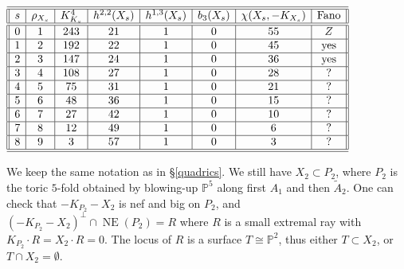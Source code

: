 \documentclass[a4paper,12pt]{amsart}
\theoremstyle{definition}
\numberwithin{figure}{section}
\numberwithin{table}{section}
\newcommand{\w}{\widetilde}
\newcommand{\pr}{\mathbb{P}}
\newcommand{\NE}{\operatorname{NE}}
\begin{document}
{\small\begin{table}[h]
 $\begin{array}{||c|c|c|c|c|c|c|c||}
   \hline\hline
   
s   & \rho_{X_s} & K_{K_s}^4 & h^{2,2}(X_s) & h^{1,3}(X_s) &b_3(X_s)& \chi(X_s,-K_{X_s}) & \text{Fano}\\
      \hline\hline

         0 & 1 & 243 & 21 & 1 & 0 & 55 & Z \\

        \hline

       1 & 2 & 192 & 22  & 1 & 0 & 45 & \text{yes}\\

       \hline

     2 & 3 & 147 & 24 & 1 & 0 & 36  & \text{yes}\\

       
  \hline

      3 & 4 & 108 &27 &  1  & 0 & 28 & ?\\

        \hline

    4  & 5 & 75 & 31 &  1 & 0 & 21 & ?\\

     \hline

       5 & 6 & 48 & 36 & 1  & 0 & 15 & ?\\

       \hline

     6 & 7 & 27 & 42 & 1  & 0 & 10  & ?\\

       
  \hline

      7 & 8 & 12 & 49 & 1  & 0 & 6 & ?\\

        \hline

      8  & 9 & 3 & 57 & 1  & 0 & 3 & ?\\
      
\hline\hline
  \end{array}$

\bigskip
  
  \caption{Invariants of the blow-ups of a cubic $4$-fold along $s$ planes}\label{t3}
\end{table}}

 We keep the same notation as in \S\ref{quadrics}. We still have $X_2\subset P_2$, where $P_2$ is the toric $5$-fold obtained by blowing-up $\pr^5$ along first $A_1$ and then $\w{A}_2$. One can check that $-K_{P_2}-X_2$ is nef and big on $P_2$, and $(-K_{P_2}-X_2)^{\perp}\cap\NE(P_2)=R$ where $R$ is a small extremal ray with $K_{P_2}\cdot R= X_2\cdot R=0$. The locus of $R$ is a surface $T\cong\pr^2$, thus either $T\subset X_2$, or $T\cap X_2=\emptyset$.
\end{document}
